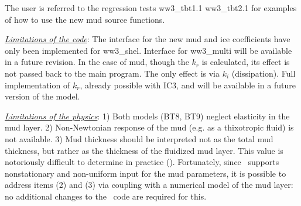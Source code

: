 The user is referred to the regression tests {\file ww3\_tbt1.1} {\file
ww3\_tbt2.1} for examples of how to use the new mud source functions.

\textrm{\textit{\underline{Limitations of the code}}}: The interface for the
new mud and ice coefficients have only been implemented for {\file
ww3\_shel}. Interface for {\file ww3\_multi} will be available in a future
revision. In the case of mud, though the ${k_r}$ is calculated, its effect is
not passed back to the main program. The only effect is via ${k_i}$
(dissipation). Full implementation of ${k_r}$, already possible with IC3, and
will be available in a future version of the model.

\textrm{\textit{\underline{Limitations of the physics}}}: 1) Both models
({\code BT8}, {\code BT9}) neglect elasticity in the mud layer. 2)
Non-Newtonian response of the mud (e.g. as a thixotropic fluid) is not
available. 3) Mud thickness should be interpreted not as the total mud
thickness, but rather as the thickness of the fluidized mud layer. This value
is notoriously difficult to determine in practice
(\cite{art:RH09}). Fortunately, since \ws\ supports nonstationary and
non-uniform input for the mud parameters, it is possible to address items (2)
and (3) via coupling with a numerical model of the mud layer: no additional
changes to the \ws\ code are required for this.
